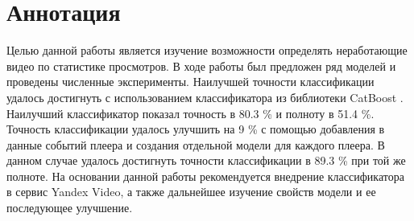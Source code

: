 
\chapter{Аннотация}

Целью данной работы является изучение возможности определять неработающие видео по статистике просмотров. В ходе работы был предложен ряд моделей и проведены численные эксперименты. Наилучшей точности классификации удалось достигнуть с использованием классификатора из библиотеки CatBoost \cite{Prokhorenkova2017}. Наилучший классификатор показал точность в 80.3 \% и полноту в 51.4 \%. Точность классификации удалось улучшить на 9 \% с помощью добавления в данные событий плеера и создания отдельной модели для каждого плеера. В данном случае удалось достигнуть точности классификации в 89.3 \% при той же полноте. На основании данной работы рекомендуется внедрение классификатора в сервис Yandex Video, а также дальнейшее изучение свойств модели и ее последующее улучшение.